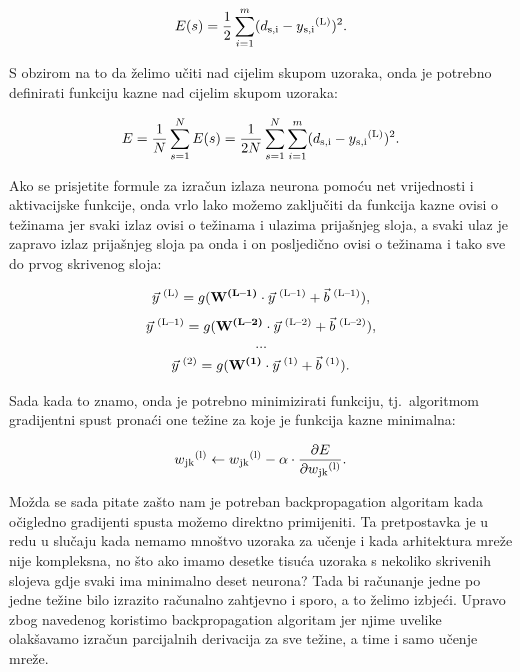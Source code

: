 \documentclass[times, utf8, zavrsni]{fer}
\begin{document}
\begin{equation}
    \label{eq:sample-err}
    E(s) = \frac{1}{2}\sum\limits_{i=1}^m(d\textsubscript{s,i} - y\textsubscript{s,i}\textsuperscript{(L)})^2.
\end{equation}

S obzirom na to da želimo učiti nad cijelim skupom uzoraka, onda je potrebno definirati funkciju kazne nad cijelim skupom uzoraka:

\begin{equation}
    \label{eq:err}
    E = \frac{1}{N}\sum\limits_{s=1}^NE(s) = \frac{1}{2N}\sum\limits_{s=1}^N\sum\limits_{i=1}^m(d\textsubscript{s,i} - y\textsubscript{s,i}\textsuperscript{(L)})^2.
\end{equation}

Ako se prisjetite formule za izračun izlaza neurona pomoću net vrijednosti i aktivacijske funkcije, onda vrlo lako možemo zaključiti da funkcija kazne ovisi o težinama jer svaki izlaz ovisi o težinama i ulazima prijašnjeg sloja, a svaki ulaz je zapravo izlaz prijašnjeg sloja pa onda i on posljedično ovisi o težinama i tako sve do prvog skrivenog sloja:

\[
    \vec{y}\textsuperscript{ (L)} = g(\textbf{W\textsuperscript{(L--1)}} \cdot{\vec{y}\textsuperscript{ (L--1)}} + \vec{b}\textsuperscript{ (L--1)}),
\]
\[
    \vec{y}\textsuperscript{ (L--1)} = g(\textbf{W\textsuperscript{(L--2)}} \cdot{\vec{y}\textsuperscript{ (L--2)}} + \vec{b}\textsuperscript{ (L--2)}),
\]
\[
    \dots
\]
\[
    \vec{y}\textsuperscript{ (2)} = g(\textbf{W\textsuperscript{(1)}} \cdot{\vec{y}\textsuperscript{ (1)}} + \vec{b}\textsuperscript{ (1)}).
\]

Sada kada to znamo, onda je potrebno minimizirati funkciju, tj.\ algoritmom gradijentni spust pronaći one težine za koje je funkcija kazne minimalna:

\begin{equation}
    \label{eq:weight-grad}
    w\textsubscript{jk}\textsuperscript{(l)} \leftarrow  w\textsubscript{jk}\textsuperscript{(l)} - \alpha \cdot{\frac{\partial E}{\partial w\textsubscript{jk}\textsuperscript{(l)}}}.
\end{equation}

Možda se sada pitate zašto nam je potreban backpropagation algoritam kada očigledno gradijenti spusta možemo direktno primijeniti. Ta pretpostavka je u redu u slučaju kada nemamo mnoštvo uzoraka za učenje i kada arhitektura mreže nije kompleksna, no što ako imamo desetke tisuća uzoraka s nekoliko skrivenih slojeva gdje svaki ima minimalno deset neurona? Tada bi računanje jedne po jedne težine bilo izrazito računalno zahtjevno i sporo, a to želimo izbjeći. Upravo zbog navedenog koristimo backpropagation algoritam jer njime uvelike olakšavamo izračun parcijalnih derivacija za sve težine, a time i samo učenje mreže.
\end{document}
